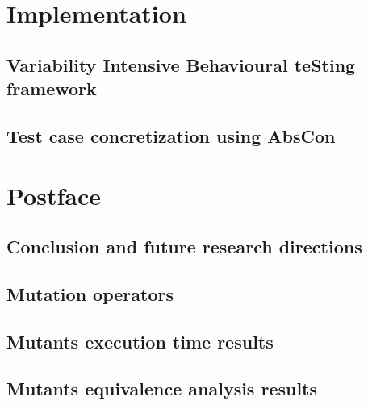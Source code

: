 \documentclass[openright,twoside]{memoir}
\begin{document}
\part{Implementation}
\label{part:implem}

\chapter{Variability Intensive Behavioural teSting framework}
\label{chap:vibes}


\chapter{Test case concretization using AbsCon}
\label{chap:concretization}


\part{Postface}
\label{part:postface}

\chapter{Conclusion and future research directions}
\label{chap:conclusion}



\appendix

%

\chapter{Mutation operators}
\label{apdx:fmm:operators}


\chapter{Mutants execution time results}
\label{apdx:fmm:exectime}


\chapter{Mutants equivalence analysis results}
\label{apdx:fmm:equivalence}


\backmatter

%



\printglossary

\end{document}
